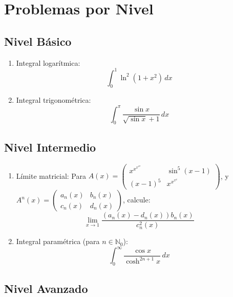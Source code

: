 \documentclass[10pt,a4paper]{article}
\begin{document}
\section*{Problemas por Nivel}

\subsection*{Nivel Básico}

\begin{enumerate}
	\item Integral logarítmica:
	      \[
		      \int_0^1 \ln^2(1+x^2) \, dx
	      \]

	\item Integral trigonométrica:
	      \[
		      \int_0^{\pi} \frac{\sin x}{\sqrt{\sin x} + 1} \, dx
	      \]
\end{enumerate}

\subsection*{Nivel Intermedio}

\begin{enumerate}
	\item Límite matricial: Para
	      \( A(x) = \begin{pmatrix}
		      x^{x^{x^{x^x}}} & \sin^5(x-1) \\
		      (x-1)^5         & x^{x^{x^x}}
	      \end{pmatrix} \), y \( A^n(x) = \begin{pmatrix}
		      a_n(x) & b_n(x) \\
		      c_n(x) & d_n(x)
	      \end{pmatrix} \), calcule:
	      \[
		      \lim_{x \to 1} \frac{(a_n(x) - d_n(x))b_n(x)}{c_n^2(x)}
	      \]

	\item Integral paramétrica (para \( n \in \mathbb{N}_0 \)):
	      \[
		      \int_0^\infty \frac{\cos x}{\cosh^{2n+1} x} \, dx
	      \]
\end{enumerate}

\subsection*{Nivel Avanzado}
\end{document}
